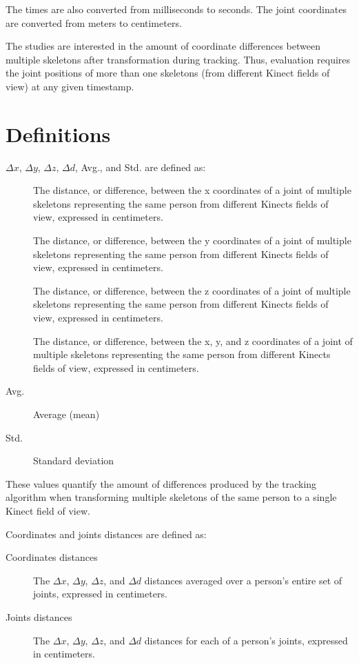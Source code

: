 The times are also converted from milliseconds to seconds. The joint coordinates are converted from meters to centimeters.

The studies are interested in the amount of coordinate differences between multiple skeletons after transformation during tracking. Thus, evaluation requires the joint positions of more than one skeletons (from different Kinect fields of view) at any given timestamp.

\section{Definitions}
\label{sec:results_definitions}

$\Delta x$, $\Delta y$, $\Delta z$, $\Delta d$, Avg., and Std. are defined as:

\begin{description}
  \item[] The distance, or difference, between the x coordinates of a joint of multiple skeletons representing the same person from different Kinects fields of view, expressed in centimeters.
  \item[] The distance, or difference, between the y coordinates of a joint of multiple skeletons representing the same person from different Kinects fields of view, expressed in centimeters.
  \item[] The distance, or difference, between the z coordinates of a joint of multiple skeletons representing the same person from different Kinects fields of view, expressed in centimeters.
  \item[] The distance, or difference, between the x, y, and z coordinates of a joint of multiple skeletons representing the same person from different Kinects fields of view, expressed in centimeters.
  \item[Avg.] Average (mean)
  \item[Std.] Standard deviation
\end{description}

These values quantify the amount of differences produced by the tracking algorithm when transforming multiple skeletons of the same person to a single Kinect field of view.

Coordinates and joints distances are defined as:

\begin{description}
  \item[Coordinates distances] The $\Delta x$, $\Delta y$, $\Delta z$, and $\Delta d$ distances averaged over a person's entire set of joints, expressed in centimeters.
  \item[Joints distances] The $\Delta x$, $\Delta y$, $\Delta z$, and $\Delta d$ distances for each of a person's joints, expressed in centimeters. 
\end{description}

